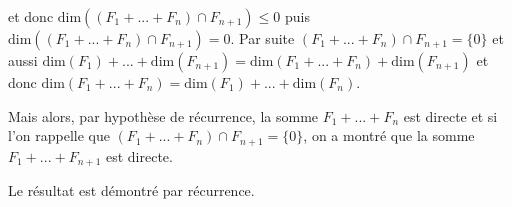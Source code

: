 {{ 
et donc $\text{dim}((F_1+...+F_n)\cap F_{n+1})\leqslant0$ puis $\text{dim}((F_1+...+F_n)\cap F_{n+1})= 0$. Par suite $(F_1+...+F_n)\cap F_{n+1}=\{0\}$ et aussi $\text{dim}(F_1)+...+\text{dim}(F_{n+1})=\text{dim}(F_1+...+F_n) +\text{dim}(F_{n+1})$ et donc $\text{dim}(F_1+...+F_n)=\text{dim}(F_1)+ ... +\text{dim}(F_n)$.

Mais alors, par hypothèse de récurrence, la somme $F_1+...+F_n$ est directe et si l'on rappelle que 
$(F_1+...+F_n)\cap F_{n+1}=\{0\}$, on a montré que la somme $F_1+...+F_{n+1}$ est directe.

Le résultat est démontré par récurrence.
}
}

